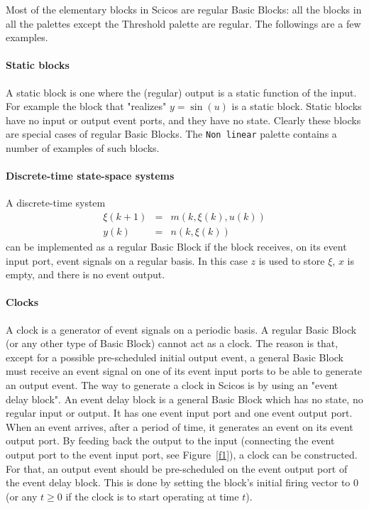 Most of the elementary blocks in Scicos  are regular Basic Blocks: all the
blocks in all the palettes except the Threshold palette are regular. The
followings are a few examples.

\paragraph{Static blocks}
A static block is one where the (regular) output is a static function
of the input. For example the block that "realizes" $y=\sin(u)$ is a
static block. Static blocks have no input or output event ports, and
they have no state. Clearly these blocks are special cases of regular
Basic Blocks. The {\tt Non linear} palette contains a number of
examples of such blocks.

\paragraph{Discrete-time state-space systems}
A discrete-time system
\begin{eqnarray}
\xi(k+1)&=&m(k,\xi(k),u(k)) \\
y(k)&=&n(k,\xi(k))
\end{eqnarray}
can be implemented as a regular Basic Block if the block
receives, on its event input port, event signals on a regular
basis. In this case $z$ is used to store $\xi$, $x$ is empty, and
there is no event output. 

\paragraph{Clocks}
A clock is a generator of event signals on a periodic basis. A regular
Basic Block (or any other type of Basic Block) cannot act as a
clock. The reason is that, except for a possible pre-scheduled initial
output event, a general Basic Block must receive an event signal on
one of its event input ports to be able to generate an output
event. The way to generate a clock in Scicos   is by using an "event 
delay block". An event delay block is a general Basic Block which has
no state, no regular input or output. It has one event input port and
one event output port. When an event arrives, after a period of time,
it generates an event on its event output port. By feeding back the
output to the input (connecting the event output port to the event
input port, see Figure~\ref{f1}), a clock can be constructed. For that,
an output event 
should be pre-scheduled on the event output port of the event delay
block. This is 
done by setting the block's initial firing vector to 0 (or any $t\ge
0$ if the clock is to start operating at time $t$).

